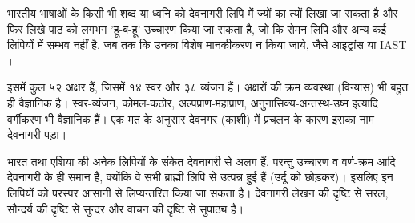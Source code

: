 \documentclass[a4paper,12pt,oneside,final]{article}
\begin{document}
भारतीय भाषाओं के किसी भी शब्द या ध्वनि को देवनागरी लिपि में ज्यों का त्यों लिखा जा सकता है और फिर लिखे पाठ को लगभग 'हू-ब-हू' उच्चारण किया जा सकता है, जो कि रोमन लिपि और अन्य कई लिपियों में सम्भव नहीं है, जब तक कि उनका विशेष मानकीकरण न किया जाये, जैसे आइट्रांस या IAST ।

इसमें कुल ५२ अक्षर हैं, जिसमें १४ स्वर और ३८ व्यंजन हैं। अक्षरों की क्रम व्यवस्था (विन्यास) भी बहुत ही वैज्ञानिक है। स्वर-व्यंजन, कोमल-कठोर, अल्पप्राण-महाप्राण, अनुनासिक्य-अन्तस्थ-उष्म इत्यादि वर्गीकरण भी वैज्ञानिक हैं। एक मत के अनुसार देवनगर (काशी) में प्रचलन के कारण इसका नाम देवनागरी पड़ा।

भारत तथा एशिया की अनेक लिपियों के संकेत देवनागरी से अलग हैं, परन्तु उच्चारण व वर्ण-क्रम आदि देवनागरी के ही समान हैं, क्योंकि वे सभी ब्राह्मी लिपि से उत्पन्न हुई हैं (उर्दू को छोड़कर)। इसलिए इन लिपियों को परस्पर आसानी से लिप्यन्तरित किया जा सकता है। देवनागरी लेखन की दृष्टि से सरल, सौन्दर्य की दृष्टि से सुन्दर और वाचन की दृष्टि से सुपाठ्य है।
\end{document}
